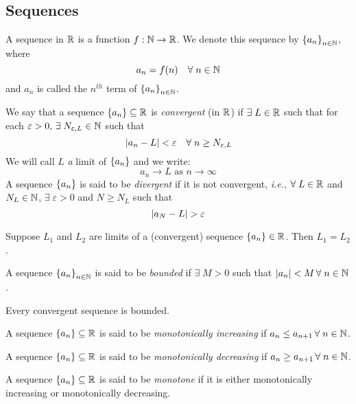 \documentclass[12pt]{article}
\begin{document}
\subsection{Sequences}

\begin{defn} \label{defn:sequence}
    A sequence in $\mathbb{R}$ is a function $f: \mathbb{N} \to \mathbb{R}$. We denote this sequence by $\set{a_{n}}_{n \in \N}$, where \[
        a_{n} = f(n) \quad \forall\; n \in \mathbb{N}
    \] and $a_{n}$ is called the $n^{th}$ term of $\set{a_{n}}_{n \in \N}$.
\end{defn}

\begin{defn} \label{defn:sequence:convergence}
    We say that a sequence $\set{a_{n}} \subseteq \R$ is \emph{convergent} (in $\mathbb{R}$) if $\exists\; L \in \mathbb{R}$ such that for each $\varepsilon > 0, \,\exists\; N_{\varepsilon,L} \in \mathbb{N}$ such that \[
        \abs{a_{n} - L} < \varepsilon \quad \forall\; n \geq N_{\varepsilon, L}
    \] 
    We will call $L$ \emph{a} limit of $\set{a_{n}}$ and we write: \[
        a_{n} \to L \text{ as } n \to \infty
    \]
    A sequence $\set{a_{n}}$ is said to be \emph{divergent} if it is not convergent, \textit{i.e.}, $\forall\; L \in \mathbb{R}$ and $N_{L} \in \mathbb{N}$, $\exists\; \varepsilon > 0$ and $N \geq N_{L}$ such that \[
        \abs{a_{N} - L} > \varepsilon
    \]
\end{defn}

\begin{thm} \label{thm:sequence:unique_limit}
    Suppose $L_{1}$ and $L_{2}$ are limits of a (convergent) sequence $\set{a_{n}} \in \R$. Then $L_{1} = L_{2}$.
\end{thm}

\begin{defn} \label{defn:sequence:bounded}
    A sequence $\set{a_{n}}_{n \in \N}$ is said to be \emph{bounded} if $\exists\; M > 0$ such that $\abs{a_{n}} < M \,\forall\; n \in \N$.
\end{defn}

\begin{thm} \label{thm:sequence:convergent=>bounded}
    Every convergent sequence is bounded.
\end{thm}

\begin{defn} \label{defn:sequence:monotone}
    A sequence $\set{a_{n}} \subseteq \R$ is said to be \emph{monotonically increasing} if $a_{n} \leq a_{n+1} \,\forall\; n \in \mathbb{N}$.

    A sequence $\set{a_{n}} \subseteq \R$ is said to be \emph{monotonically decreasing} if $a_{n} \geq a_{n+1} \,\forall\; n \in \mathbb{N}$.

    A sequence $\set{a_{n}} \subseteq \R$ is said to be \emph{monotone} if it is either monotonically increasing or monotonically decreasing.
\end{defn}
\end{document}
